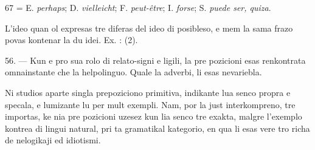 \begin{VUpage}[71]{67}
 = E. \textit{perhaps}; D. \textit{vielleicht}; F. \textit{peut-être}; I. \textit{forse};\nl
S. \textit{puede ser, quiza}.

L'ideo quan ol expresas tre diferas del ideo di posibleso,\nl
e mem la sama frazo povas kontenar la du idei. Ex. : \nl
{} (2).

\VUsaut{6.92mm}
\VUsaut{4.14mm}

56. --- Kun e pro sua rolo di relato-signi e ligili, la pre\cc
pozicioni esas renkontrata omnainstante che la helpolinguo.\nl
Quale la adverbi, li esas nevariebla.

Ni studios aparte singla prepoziciono primitiva, indikante\nl
lua senco propra e specala, e lumizante lu per mult exempli.\nl
Nam, por la just interkompreno, tre importas, ke nia pre\cc
pozicioni uzesez kun lia senco tre exakta, malgre l'exemplo\nl
kontrea di lingui natural, pri ta gramatikal kategorio, en\nl
qua li esas vere tro richa de nelogikaji ed idiotismi.
\end{VUpage}

